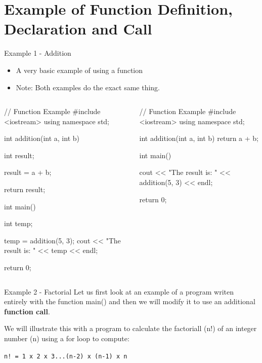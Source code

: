 \documentclass[../lecture4-functions.tex]{subfiles}
\begin{document}
\section{Example of Function Definition, Declaration and Call}


\begin{frame}[fragile]{Example 1 - Addition}
    \begin{itemize}
        \item A very basic example of using a function
        \item Note: Both examples do the exact same thing.
    \end{itemize}

    \begin{columns}[T,onlytextwidth]
            \begin{cppcode}[]
// Function Example
#include <iostream>
using namespace std;

int addition(int a, int b)
{
    int result;

    result = a + b;

    return result;
}

int main()
{
    int temp;

    temp = addition(5, 3);
    cout << "The result is: " << temp << endl;

    return 0;
}
            \end{cppcode}
                \begin{cppcode}[]
// Function Example
#include <iostream>
using namespace std;

int addition(int a, int b)
{
    return a + b;
}

int main()
{
    cout << "The result is: " << addition(5, 3) << endl;

    return 0;
}
                \end{cppcode}
    \end{columns}
\end{frame}


\begin{frame}[fragile]{Example 2 - Factorial}
    Let us first look at an example of a program writen entirely with the function main() and then we will modify it to use an additional \textbf{function call}. \newline

    We will illustrate this with a program to calculate the factoriall (n!) of an integer number (n) using a for loop to compute:

    \verb|n! = 1 x 2 x 3...(n-2) x (n-1) x n|
\end{frame}
\end{document}

